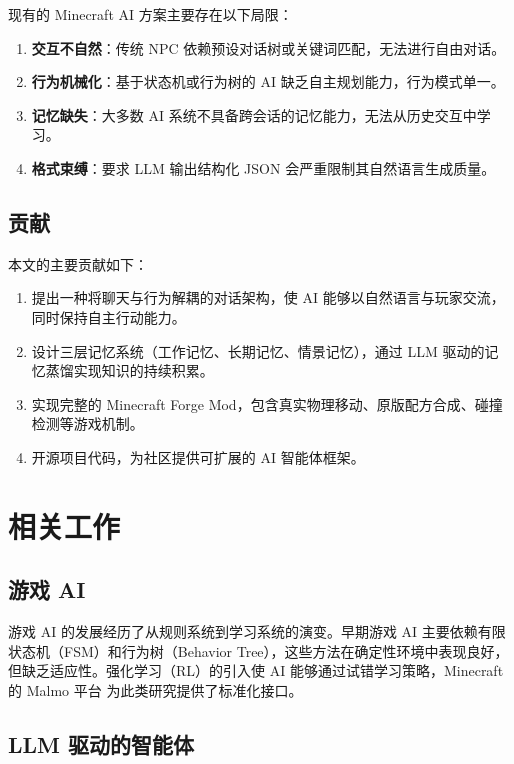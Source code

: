 \documentclass[12pt,a4paper]{article}
\begin{document}
现有的 Minecraft AI 方案主要存在以下局限：

\begin{enumerate}
    \item \textbf{交互不自然}：传统 NPC 依赖预设对话树或关键词匹配，无法进行自由对话。
    \item \textbf{行为机械化}：基于状态机或行为树的 AI 缺乏自主规划能力，行为模式单一。
    \item \textbf{记忆缺失}：大多数 AI 系统不具备跨会话的记忆能力，无法从历史交互中学习。
    \item \textbf{格式束缚}：要求 LLM 输出结构化 JSON 会严重限制其自然语言生成质量。
\end{enumerate}

\subsection{贡献}

本文的主要贡献如下：

\begin{enumerate}
    \item 提出一种将聊天与行为解耦的对话架构，使 AI 能够以自然语言与玩家交流，同时保持自主行动能力。
    \item 设计三层记忆系统（工作记忆、长期记忆、情景记忆），通过 LLM 驱动的记忆蒸馏实现知识的持续积累。
    \item 实现完整的 Minecraft Forge Mod，包含真实物理移动、原版配方合成、碰撞检测等游戏机制。
    \item 开源项目代码，为社区提供可扩展的 AI 智能体框架。
\end{enumerate}

\section{相关工作}

\subsection{游戏 AI}

游戏 AI 的发展经历了从规则系统到学习系统的演变。早期游戏 AI 主要依赖有限状态机（FSM）和行为树（Behavior Tree）\cite{millington2019artificial}，这些方法在确定性环境中表现良好，但缺乏适应性。强化学习（RL）的引入使 AI 能够通过试错学习策略\cite{mnih2015human}，Minecraft 的 Malmo 平台\cite{johnson2016malmo} 为此类研究提供了标准化接口。

\subsection{LLM 驱动的智能体}
\end{document}
